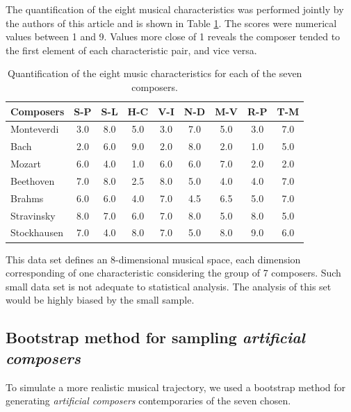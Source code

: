 \documentclass[
 aip,
 jmp,
 amsmath,amssymb,
 reprint,
]{revtex4-1}
\begin{document}
The quantification of the eight musical
characteristics was performed jointly by the authors of this
article and is shown in Table \ref{tab:tableA}. The scores were
numerical values between 1 and 9. Values more close of 1 reveals the
composer tended to the first element of each characteristic pair, and
vice versa. 

\begin{table}[ht]
\caption{\label{tab:tableA}Quantification of the
eight music characteristics for each of the seven composers.}

\begin{ruledtabular}
\begin{tabular}{|l||c|c|c|c|c|c|c|c|}

 Composers    & S-P & S-L & H-C & V-I & N-D & M-V & R-P & T-M  \\
\hline
 Monteverdi   & 3.0 & 8.0 & 5.0 & 3.0 & 7.0 & 5.0 & 3.0 & 7.0  \\
 Bach         & 2.0 & 6.0 & 9.0 & 2.0 & 8.0 & 2.0 & 1.0 & 5.0  \\
 Mozart       & 6.0 & 4.0 & 1.0 & 6.0 & 6.0 & 7.0 & 2.0 & 2.0  \\
 Beethoven    & 7.0 & 8.0 & 2.5 & 8.0 & 5.0 & 4.0 & 4.0 & 7.0  \\
 Brahms       & 6.0 & 6.0 & 4.0 & 7.0 & 4.5 & 6.5 & 5.0 & 7.0  \\
 Stravinsky   & 8.0 & 7.0 & 6.0 & 7.0 & 8.0 & 5.0 & 8.0 & 5.0  \\
 Stockhausen  & 7.0 & 4.0 & 8.0 & 7.0 & 5.0 & 8.0 & 9.0 & 6.0  \\

\end{tabular}
\end{ruledtabular}
\end{table}

This data set defines an 8-dimensional musical space, each dimension
corresponding of one characteristic considering the group of 7 composers. 
Such small data set is not adequate to statistical analysis. The analysis of this set would
be highly biased by the small sample.

\subsection{Bootstrap method for sampling \emph{artificial composers}}

To simulate a more realistic musical trajectory, we used a bootstrap
method for generating \emph{artificial composers} contemporaries of the seven chosen.
\end{document}
